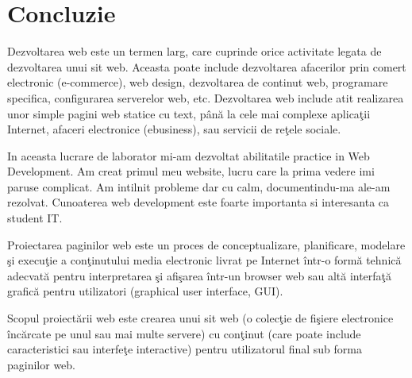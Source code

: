 
\section*{Concluzie}


Dezvoltarea web este un termen larg, care cuprinde orice activitate legata de dezvoltarea unui sit web. Aceasta poate include dezvoltarea afacerilor prin comert electronic (e-commerce), web design, dezvoltarea de continut web, programare specifica, configurarea serverelor web, etc. Dezvoltarea web include atit realizarea unor simple pagini web statice cu text, până la cele mai complexe aplicaţii Internet, afaceri electronice (ebusiness), sau servicii de reţele sociale.


In aceasta lucrare de laborator mi-am dezvoltat abilitatile practice in Web Development. Am creat primul meu website, lucru care la prima vedere imi paruse complicat. Am intilnit probleme dar cu calm, documentindu-ma ale-am rezolvat. Cunoaterea web development este foarte importanta si interesanta ca student IT.


Proiectarea paginilor web este un proces de conceptualizare, planificare, modelare şi execuţie a conţinutului media electronic livrat pe Internet într-o formă tehnică adecvată pentru interpretarea şi afişarea într-un browser web sau altă interfaţă grafică pentru utilizatori (graphical user interface, GUI).

Scopul proiectării web este crearea unui sit web (o colecţie de fişiere electronice încărcate pe unul sau mai multe servere) cu conţinut (care poate include caracteristici sau interfeţe interactive) pentru utilizatorul final sub forma paginilor web.
\clearpage

      
